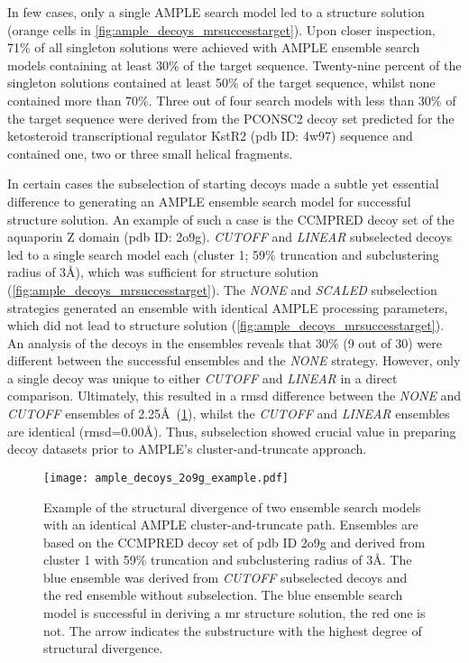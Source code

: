 In few cases, only a single AMPLE search model led to a structure solution (orange cells in \cref{fig:ample_decoys_mrsuccesstarget}). Upon closer inspection, 71\% of all singleton solutions were achieved with AMPLE ensemble search models containing at least 30\% of the target sequence. Twenty-nine percent of the singleton solutions contained at least 50\% of the target sequence, whilst none contained more than 70\%. Three out of four search models with less than 30\% of the target sequence were derived from the PCONSC2 decoy set predicted for the ketosteroid transcriptional regulator KstR2 (\gls{pdb} ID: 4w97) sequence and contained one, two or three small helical fragments.  

In certain cases the subselection of starting decoys made a subtle yet essential difference to generating an AMPLE ensemble search model for successful structure solution. An example of such a case is the CCMPRED decoy set of the aquaporin Z domain (\gls{pdb} ID: 2o9g). \textit{CUTOFF} and \textit{LINEAR} subselected decoys led to a single search model each (cluster 1; 59\% truncation and subclustering radius of 3\AA), which was sufficient for structure solution (\cref{fig:ample_decoys_mrsuccesstarget}). The \textit{NONE} and \textit{SCALED} subselection strategies generated an ensemble with identical AMPLE processing parameters, which did not lead to structure solution (\cref{fig:ample_decoys_mrsuccesstarget}). An analysis of the decoys in the ensembles reveals that 30\% (9 out of 30) were different between the successful ensembles and the \textit{NONE} strategy. However, only a single decoy was unique to either \textit{CUTOFF} and \textit{LINEAR} in a direct comparison. Ultimately, this resulted in a \gls{rmsd} difference between the \textit{NONE} and \textit{CUTOFF} ensembles of 2.25\AA\ (\cref{fig:ample_decoys_2o9g_example}), whilst the \textit{CUTOFF} and \textit{LINEAR} ensembles are identical (\gls{rmsd}=0.00\AA). Thus, subselection showed crucial value in preparing decoy datasets prior to AMPLE's cluster-and-truncate approach.

\begin{figure}[H]
    \centering
    \texttt{[image: ample\_decoys\_2o9g\_example.pdf]}
    \caption[Comparison of ensembles derived from differently subselected decoys]{Example of the structural divergence of two ensemble search models with an identical AMPLE cluster-and-truncate path. Ensembles are based on the CCMPRED decoy set of \gls{pdb} ID 2o9g and derived from cluster 1 with 59\% truncation and subclustering radius of 3\AA. The blue ensemble was derived from \textit{CUTOFF} subselected decoys and the red ensemble without subselection. The blue ensemble search model is successful in deriving a \gls{mr} structure solution, the red one is not. The arrow indicates the substructure with the highest degree of structural divergence.}
    \label{fig:ample_decoys_2o9g_example}
\end{figure}

